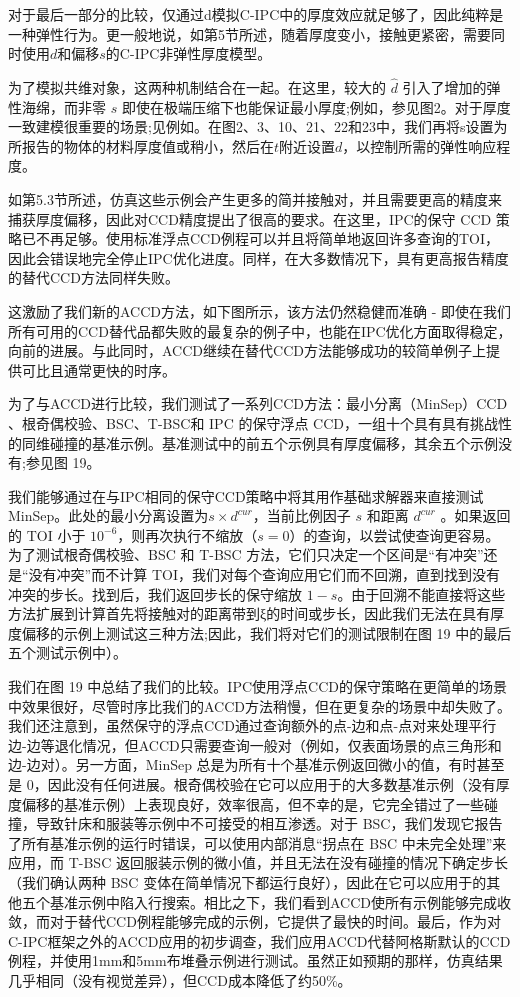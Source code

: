 对于最后一部分的比较，仅通过d模拟C-IPC中的厚度效应就足够了，因此纯粹是一种弹性行为。更一般地说，如第5节所述，随着厚度变小，接触更紧密，需要同时使用$d$和偏移$s$的C-IPC非弹性厚度模型。

为了模拟共维对象，这两种机制结合在一起。在这里，较大的 $\hat d$ 引入了增加的弹性海绵，而非零 $s$ 即使在极端压缩下也能保证最小厚度;例如，参见图2。对于厚度一致建模很重要的场景;见例如。在图2、3、10、21、22和23中，我们再将s设置为所报告的物体的材料厚度值或稍小，然后在$t$附近设置$d$，以控制所需的弹性响应程度。

如第5.3节所述，仿真这些示例会产生更多的简并接触对，并且需要更高的精度来捕获厚度偏移，因此对CCD精度提出了很高的要求。在这里，IPC的保守 CCD 策略已不再足够。使用标准浮点CCD例程可以并且将简单地返回许多查询的TOI，因此会错误地完全停止IPC优化进度。同样，在大多数情况下，具有更高报告精度的替代CCD方法同样失败。

这激励了我们新的ACCD方法，如下图所示，该方法仍然稳健而准确 - 即使在我们所有可用的CCD替代品都失败的最复杂的例子中，也能在IPC优化方面取得稳定，向前的进展。与此同时，ACCD继续在替代CCD方法能够成功的较简单例子上提供可比且通常更快的时序。

为了与ACCD进行比较，我们测试了一系列CCD方法：最小分离（MinSep）CCD 、根奇偶校验、BSC、T-BSC和 IPC 的保守浮点 CCD，一组十个具有具有挑战性的同维碰撞的基准示例。基准测试中的前五个示例具有厚度偏移，其余五个示例没有;参见图 19。

我们能够通过在与IPC相同的保守CCD策略中将其用作基础求解器来直接测试MinSep。此处的最小分离设置为$s \times d^{cur}$，当前比例因子 $s$ 和距离 $d^{cur}$ 。如果返回的 TOI 小于 $10^{−6}$，则再次执行不缩放（$s = 0$）的查询，以尝试使查询更容易。为了测试根奇偶校验、BSC 和 T-BSC 方法，它们只决定一个区间是“有冲突”还是“没有冲突”而不计算 TOI，我们对每个查询应用它们而不回溯，直到找到没有冲突的步长。找到后，我们返回步长的保守缩放 $1 − s$。由于回溯不能直接将这些方法扩展到计算首先将接触对的距离带到ξ的时间或步长，因此我们无法在具有厚度偏移的示例上测试这三种方法;因此，我们将对它们的测试限制在图 19 中的最后五个测试示例中）。

我们在图 19 中总结了我们的比较。IPC使用浮点CCD的保守策略在更简单的场景中效果很好，尽管时序比我们的ACCD方法稍慢，但在更复杂的场景中却失败了。我们还注意到，虽然保守的浮点CCD通过查询额外的点-边和点-点对来处理平行边-边等退化情况，但ACCD只需要查询一般对（例如，仅表面场景的点三角形和边-边对）。另一方面，MinSep 总是为所有十个基准示例返回微小的值，有时甚至是 0，因此没有任何进展。根奇偶校验在它可以应用于的大多数基准示例（没有厚度偏移的基准示例）上表现良好，效率很高，但不幸的是，它完全错过了一些碰撞，导致针床和服装等示例中不可接受的相互渗透。对于 BSC，我们发现它报告了所有基准示例的运行时错误，可以使用内部消息“拐点在 BSC 中未完全处理”来应用，而 T-BSC 返回服装示例的微小值，并且无法在没有碰撞的情况下确定步长（我们确认两种 BSC 变体在简单情况下都运行良好），因此在它可以应用于的其他五个基准示例中陷入行搜索。相比之下，我们看到ACCD使所有示例能够完成收敛，而对于替代CCD例程能够完成的示例，它提供了最快的时间。最后，作为对C-IPC框架之外的ACCD应用的初步调查，我们应用ACCD代替阿格斯默认的CCD例程，并使用1mm和5mm布堆叠示例进行测试。虽然正如预期的那样，仿真结果几乎相同（没有视觉差异），但CCD成本降低了约50\%。


